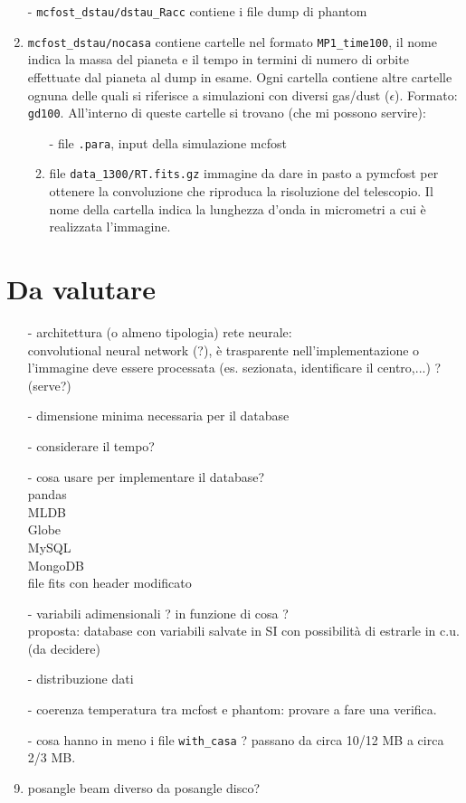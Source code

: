 \documentclass[DIN, pagenumber=false, fontsize=11pt, parskip=half]{scrartcl}
\begin{document}
\begin{enumerate}
 \item[-] \lstinline{mcfost_dstau/dstau_Racc} contiene i file dump di phantom
 \item[-] \lstinline{mcfost_dstau/nocasa} contiene cartelle nel formato \lstinline{MP1_time100}, il nome indica la massa del pianeta e il tempo in termini di numero di orbite effettuate dal pianeta al dump in esame. Ogni cartella contiene
 altre cartelle ognuna delle quali si riferisce a simulazioni con diversi gas/dust ($\epsilon$). Formato: \lstinline{gd100}. All'interno di queste cartelle si trovano (che mi possono servire):
 \begin{enumerate}
 \item[-] file \lstinline{.para}, input della simulazione mcfost 
 \item[-] file \lstinline{data_1300/RT.fits.gz} immagine da dare in pasto a pymcfost per ottenere la convoluzione che riproduca la risoluzione del telescopio. Il nome della cartella indica la lunghezza d'onda in micrometri a cui è realizzata l'immagine.
\end{enumerate}
\end{enumerate}


\section{Da valutare}
\begin{enumerate}
 \item[-] architettura (o almeno tipologia) rete neurale: \\ convolutional neural network (?), è trasparente nell'implementazione o l'immagine deve essere processata (es. sezionata, identificare il centro,...) ? (serve?)
 \item[-] dimensione minima necessaria per il database
 \item[-] considerare il tempo?
 \item[-] cosa usare per implementare il database? \\ pandas \\ MLDB \\ Globe \\ MySQL \\ MongoDB \\ file fits con header modificato
 \item[-] variabili adimensionali ? in funzione di cosa ? \\ proposta: database con variabili salvate in SI con possibilità di estrarle in c.u. (da decidere)
 \item[-] distribuzione dati
 \item[-] coerenza temperatura tra mcfost e phantom: provare a fare una verifica. \item[-] cosa hanno in meno i file \lstinline{with_casa} ? passano da circa 10/12 MB a circa 2/3 MB.
 \item[-] posangle beam diverso da posangle disco?
\end{enumerate}
\end{document}
